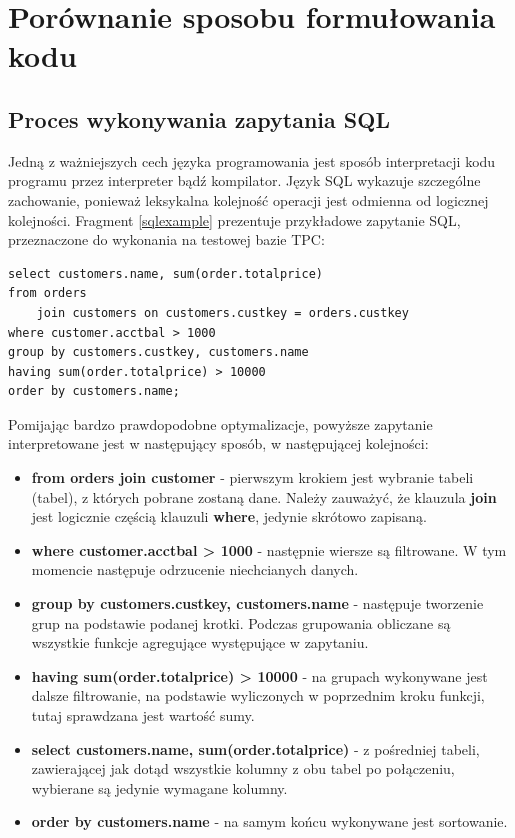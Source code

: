 \documentclass[12pt]{extarticle}
\begin{document}
\section{Porównanie sposobu formułowania kodu}

\subsection{Proces wykonywania zapytania SQL}

    Jedną z ważniejszych cech języka programowania jest sposób interpretacji kodu programu przez interpreter bądź kompilator. Język SQL wykazuje szczególne zachowanie, ponieważ leksykalna kolejność operacji jest odmienna od logicznej kolejności. Fragment \ref{sqlexample} prezentuje przykładowe zapytanie SQL, przeznaczone do wykonania na testowej bazie TPC:


\begin{lstlisting}[label=sqlexample, caption=Przykład kolejności wykonywania zapytania SQL]
select customers.name, sum(order.totalprice)
from orders 
    join customers on customers.custkey = orders.custkey
where customer.acctbal > 1000
group by customers.custkey, customers.name
having sum(order.totalprice) > 10000
order by customers.name;
\end{lstlisting}

Pomijając bardzo prawdopodobne optymalizacje, powyższe zapytanie interpretowane jest w następujący sposób, w następującej kolejności:

\begin{itemize}
    \item \textbf{from orders join customer} - pierwszym krokiem jest wybranie tabeli (tabel), z których pobrane zostaną dane. Należy zauważyć, że klauzula \textbf{join} jest logicznie częścią klauzuli \textbf{where}, jedynie skrótowo zapisaną.
    \item \textbf{where customer.acctbal > 1000} - następnie wiersze są filtrowane. W tym momencie następuje odrzucenie niechcianych danych. 
    \item \textbf{group by customers.custkey, customers.name} - następuje tworzenie grup na podstawie podanej krotki. Podczas grupowania obliczane są wszystkie funkcje agregujące występujące w zapytaniu.
    \item \textbf{having sum(order.totalprice) > 10000} - na grupach wykonywane jest dalsze filtrowanie, na podstawie wyliczonych w poprzednim kroku funkcji, tutaj sprawdzana jest wartość sumy.
    \item \textbf{select customers.name, sum(order.totalprice)} - z pośredniej tabeli, zawierającej jak dotąd wszystkie kolumny z obu tabel po połączeniu, wybierane są jedynie wymagane kolumny.
    \item \textbf{order by customers.name} - na samym końcu wykonywane jest sortowanie.
\end{itemize}
\end{document}
